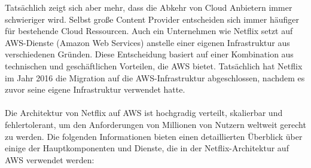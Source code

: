 Tatsächlich zeigt sich aber mehr, dass die Abkehr von Cloud Anbietern immer schwieriger wird. Selbst große Content Provider entscheiden sich immer häufiger für bestehende Cloud Ressourcen. Auch ein Unternehmen wie Netflix setzt auf AWS-Dienste (Amazon Web Services) anstelle einer eigenen Infrastruktur aus verschiedenen Gründen. Diese Entscheidung basiert auf einer Kombination aus technischen und geschäftlichen Vorteilen, die AWS bietet. Tatsächlich hat Netflix im Jahr 2016 die Migration auf die AWS-Infrastruktur abgeschlossen, nachdem es zuvor seine eigene Infrastruktur verwendet hatte. 
\\\\
Die Architektur von Netflix auf AWS ist hochgradig verteilt, skalierbar und fehlertolerant, um den Anforderungen von Millionen von Nutzern weltweit gerecht zu werden. Die folgenden Informationen bieten einen detaillierten Überblick über einige der Hauptkomponenten und Dienste, die in der Netflix-Architektur auf AWS verwendet werden:
